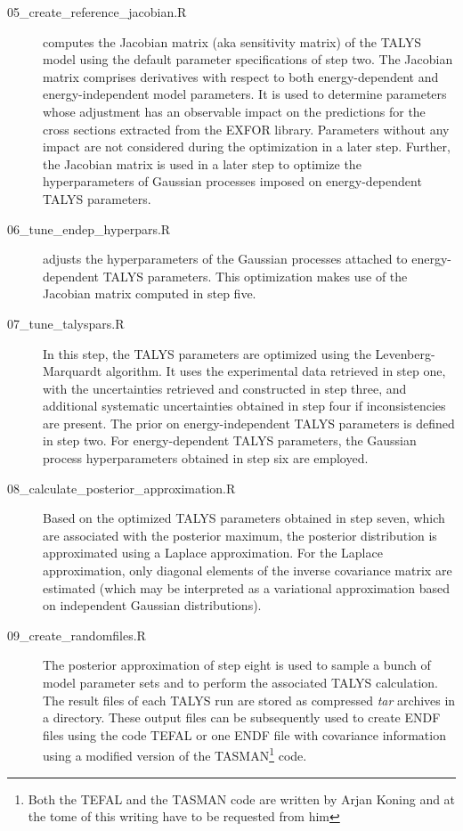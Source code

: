 \documentclass[12pt,a4paper]{scrartcl}
\begin{document}
\begin{description}
 \item[05\_create\_reference\_jacobian.R]
 computes the Jacobian matrix (aka sensitivity matrix) of the TALYS model using the default parameter specifications of step two.
 The Jacobian matrix comprises derivatives with respect to both energy-dependent and energy-independent model parameters.
 It is used to determine parameters whose adjustment has an observable impact on the predictions for the cross sections extracted from the EXFOR library.
 Parameters without any impact are not considered during the optimization in a later step.
 Further, the Jacobian matrix is used in a later step to optimize the hyperparameters of Gaussian processes imposed on energy-dependent TALYS parameters.
 
 \item[06\_tune\_endep\_hyperpars.R]
 adjusts the hyperparameters of the Gaussian processes attached to energy-dependent TALYS parameters.
 This optimization makes use of the Jacobian matrix computed in step five.
 
 \item[07\_tune\_talyspars.R]
 In this step, the TALYS parameters are optimized using the Levenberg-Marquardt algorithm.
 It uses the experimental data retrieved in step one, with the uncertainties retrieved and constructed in step three, and additional systematic uncertainties obtained in step four if inconsistencies are present.
 The prior on energy-independent TALYS parameters is defined in step two. For energy-dependent TALYS parameters, the Gaussian process hyperparameters obtained in step six are employed.
 
 \item[08\_calculate\_posterior\_approximation.R]
 Based on the optimized TALYS parameters obtained in step seven, which are associated with the posterior maximum, the posterior distribution is approximated using a Laplace approximation.
 For the Laplace approximation, only diagonal elements of the inverse covariance matrix are estimated (which may be interpreted as a variational approximation based on independent Gaussian distributions).
 
 \item[09\_create\_randomfiles.R]
 The posterior approximation of step eight is used to sample a bunch of model parameter sets and to perform the associated TALYS calculation.
 The result files of each TALYS run are stored as compressed \textit{tar} archives in a directory.
 These output files can be subsequently used to create ENDF files using the code TEFAL or one ENDF file with covariance information using a modified version of the TASMAN\footnote{Both the TEFAL and the TASMAN code are written by Arjan Koning and at the tome of this writing have to be requested from him} code.
\end{description}
\end{document}
